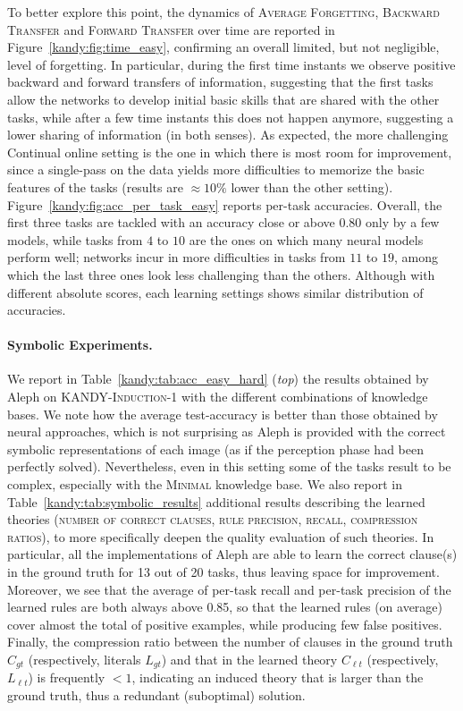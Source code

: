 To better explore this point, the dynamics of \textsc{Average Forgetting}, \textsc{Backward Transfer} and \textsc{Forward Transfer} over time are reported in Figure~\ref{kandy:fig:time_easy}, confirming an overall limited, but not negligible, level of forgetting. In particular, during the first time instants we observe positive backward and forward transfers of information, suggesting that the first tasks allow the networks to develop initial basic skills that are shared with the other tasks, while after a few time instants this does not happen anymore, suggesting a lower sharing of information (in both senses). %
As expected, the more challenging {\sc\small Continual online} setting is the one in which there is most room for improvement, since a single-pass on the data yields more difficulties to memorize the basic features of the tasks (results are $\approx 10\%$ lower than the other setting).
% 
Figure~\ref{kandy:fig:acc_per_task_easy} reports per-task accuracies. Overall, the first three tasks are tackled with an accuracy close or above $0.80$ only by a few models, while tasks from $4$ to $10$ are the ones on which many neural models perform well; networks incur in more difficulties in tasks from $11$ to $19$, among which the last three ones look less challenging than the others. Although with different absolute scores, each learning settings shows similar distribution of accuracies.

\paragraph{Symbolic Experiments.}
We report in Table~\ref{kandy:tab:acc_easy_hard} ({\it top}) the results obtained by Aleph on \textsc{KANDY-Induction-1} with the different combinations of knowledge bases. We note how the average test-accuracy is better than those obtained by neural approaches, which is not surprising as Aleph is provided with the correct symbolic representations of each image (as if the perception phase had been perfectly solved). Nevertheless, even in this setting some of the tasks result to be complex, especially with the \textsc{Minimal} knowledge base. We also report in Table~\ref{kandy:tab:symbolic_results} additional results describing the learned theories (\textsc{number of correct clauses}, \textsc{rule precision}, \textsc{recall}, \textsc{compression ratios}), to more specifically deepen the quality evaluation of such theories. In particular, all the implementations of Aleph are able to learn the correct clause(s) in the ground truth for 13 out of 20 tasks, thus leaving space for improvement. Moreover, we see that the average of per-task recall and per-task precision of the learned rules are both always above 0.85, so that the learned rules (on average) cover almost the total of positive examples, while producing few false positives.
%
Finally, the compression ratio between the number of clauses in the ground truth $C_{gt}$ (respectively, literals $L_{gt}$) and that in the learned theory $C_{\ell t}$ (respectively, $L_{\ell t}$) is frequently $< 1$, indicating an induced theory that is larger than the ground truth, thus a redundant (suboptimal) solution.

